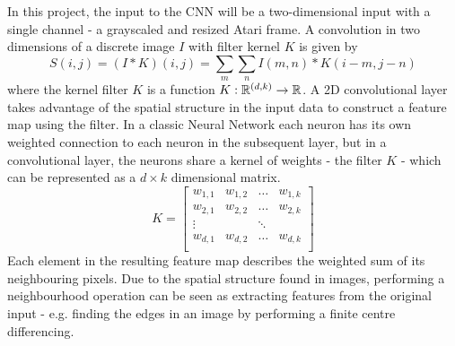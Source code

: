 \documentclass[11pt]{article}
\begin{document}
In this project, the input to the CNN will be a two-dimensional input with a single
channel - a grayscaled and resized Atari frame.
A convolution in two dimensions of a discrete image $I$ with filter kernel $K$
is given by 
\begin{equation}
    S(i, j) = (I \ast K)(i, j) = \sum\limits_m \sum\limits_n I(m, n) * K(i - m, j - n)
\end{equation}
where the kernel filter $K$ is a function $K : \mathbb{R}^{(d, k)} \to \mathbb{R}$.
A 2D convolutional layer takes advantage of the spatial structure in the input data to construct a feature map
using the filter.
In a classic Neural Network each neuron has its own weighted connection to each neuron in the subsequent layer,
but in a convolutional layer, the neurons share a kernel of weights - the filter $K$ -  which can be represented as
a $d \times k$ dimensional matrix.
$$
K =
\begin{bmatrix}
    w_{1,1 } & w_{1, 2} & \hdots & w_{1, k} \\
    w_{2,1 } & w_{2, 2} & \hdots & w_{2, k} \\
    \vdots   &          & \ddots &          \\
    w_{d,1 } & w_{d, 2} & \hdots & w_{d, k} \\
\end{bmatrix}
$$
Each element in the resulting feature map describes the weighted sum of its neighbouring
pixels.
Due to the spatial structure found in images, performing a neighbourhood operation
can be seen as extracting features from the original input - e.g. finding the
edges in an image by performing a finite centre differencing.
\end{document}
